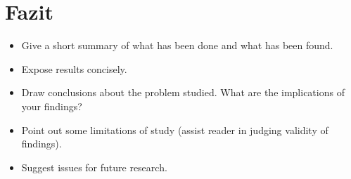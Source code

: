 \section{Fazit}\label{Sec:Conc}

\begin{itemize}

    \item Give a short summary of what has been done and what has been
    found.

    \item Expose results concisely.

    \item Draw conclusions about the problem studied. What are the
    implications of your findings?

    \item Point out some limitations of study (assist reader in judging validity
    of findings).

    \item Suggest issues for future research.

\end{itemize}
